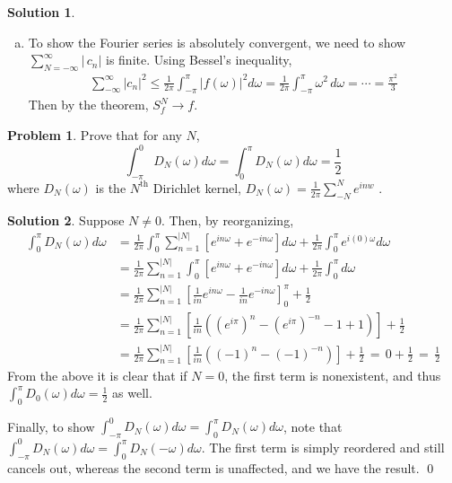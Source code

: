 \documentclass[10pt]{article}
\theoremstyle{plain}
\theoremstyle{definition}
\newtheorem{prob}{Problem}
\newtheorem*{soln*}{Solution}
\numberwithin{equation}{section}
\begin{document}
\begin{soln*}
\begin{enumerate}[(a)]
        \item
            To show the Fourier series is absolutely convergent, we need to show
            $\displaystyle \sum_{N=-\infty}^\infty \left|\,{c_n} \right|$ is finite. 
            Using Bessel's inequality,
            \begin{align*}
                \sum_{-\infty}^{\infty}|c_n|^2
                    \leq \frac{1}{2\pi} \int_{-\pi}^{\pi} | f(\omega) |^2 d\omega
                    =\frac{1}{2\pi} \int_{-\pi}^{\pi} \omega^2 \,d\omega = \cdots = \frac{\pi^2}{3}
                \end{align*}
            Then by the theorem, $S_f^N \rightarrow f$.
    \end{enumerate}
\end{soln*}

\hrulefill
\newpage
\begin{prob}
    Prove that for any $N$,
    \[
            \int_{-\pi}^0  D_N(\omega) d\omega
        =   \int_{0}^{\pi}  D_N(\omega) d\omega = \frac{1}{2}
    \]
    where $D_N(\omega)$ is the $N^{\text{th}}$ Dirichlet kernel,
    $\displaystyle D_N(\omega) = \frac{1}{2\pi}\sum_{-N}^N e^{inw}$\,\,.
\end{prob}
\begin{soln*}
    Suppose $N\neq 0$. Then, by reorganizing,
    \begin{align*}
        \int_0^\pi D_N(\omega)d\omega &=
        \frac{1}{2\pi} \int_0^\pi \sum_{n=1}^{|N|}\left[
        e^{in\omega} + e^{-in\omega}\right] d\omega + \frac{1}{2\pi}\int_0^\pi e^{i(0)\omega} d\omega \\
        &= \frac{1}{2\pi} \sum_{n=1}^{|N|}\int_0^\pi \left[
        e^{in\omega} + e^{-in\omega}\right] d\omega + \frac{1}{2\pi}\int_0^\pi d\omega \\
        &= \frac{1}{2\pi} \sum_{n=1}^{|N|}
            \left[ \frac{1}{in} e^{in\omega} -\frac{1}{in} e^{-in\omega}\right]_0^\pi
            + \frac{1}{2} \\ 
        &= \frac{1}{2\pi} \sum_{n=1}^{|N|}
            \left[ \frac{1}{in}\left(
            \left(e^{i\pi}\right)^n - \left(e^{i\pi}\right)^{-n} - 1 + 1
        \right)\right] + \frac{1}{2}\\
        &= \frac{1}{2\pi} \sum_{n=1}^{|N|}
        \left[ \frac{1}{in}\left( (-1)^n - (-1)^{-n}\right)\right] + \frac{1}{2} 
        \,=\, 0 + \frac{1}{2} \,=\, \frac{1}{2}
    \end{align*}
    From the above it is clear that if $N=0$, the first term is nonexistent, and thus
    $\int_0^\pi D_0(\omega) d\omega = \frac{1}{2}$ as well.

    Finally, to show $\int_{-\pi}^0  D_N(\omega) d\omega =   \int_{0}^{\pi}  D_N(\omega) d\omega$,
    note that $\int_{-\pi}^{0} D_N(\omega) d\omega = \int_0^\pi D_N(-\omega) d\omega$.
    The first term is simply reordered and still cancels out, whereas the second term is unaffected,
    and we have the result.
    \qed
\end{soln*}
\end{document}
